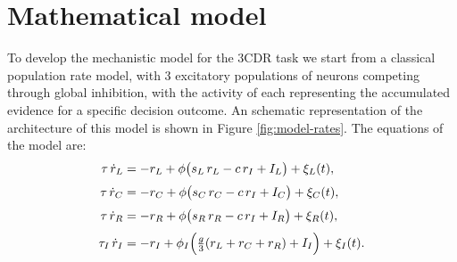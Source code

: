 \documentclass[../main.tex]{subfiles}
\begin{document}
\section{Mathematical model}
To develop the mechanistic model for the 3CDR task we start from a classical population rate model, with 3 excitatory populations of neurons competing through global inhibition, with the activity of each representing the accumulated evidence for a specific decision outcome. An schematic representation of the architecture of this model is shown in Figure \ref{fig:model-rates}. The equations of the model are:
\begin{subequations}
\label{eq:rates}
\begin{align}
  \tau\,\dot{r}_L &= -r_L + \phi\bigl(s_L\,r_L - c\,r_I + I_L \bigr) + \xi_L(t) ,  \label{eq:rL}\\[1mm]
  \tau\,\dot{r}_C &= -r_C + \phi\bigl(s_C\,r_C - c\,r_I + I_C \bigr) + \xi_C(t), \label{eq:rC}\\[1mm]
  \tau\,\dot{r}_R &= -r_R + \phi\bigl(s_R\,r_R - c\,r_I + I_R \bigr) + \xi_R(t), 
  \label{eq:rR}\\[1mm]
  \tau_I\,\dot{r}_I &= -r_I + \phi_I\Bigl(\tfrac{g}{3}(r_L+r_C+r_R) + I_I\Bigr) + \xi_I(t). \label{eq:rI}
\end{align}
\end{subequations}
\end{document}
